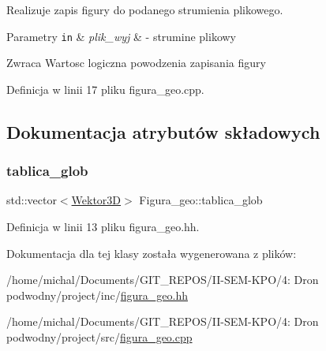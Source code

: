 Realizuje zapis figury do podanego strumienia plikowego. 


\begin{DoxyParams}[1]{Parametry}
\mbox{\tt in}  & {\em plik\+\_\+wyj} & -\/ strumine plikowy \\
\hline
\end{DoxyParams}
\begin{DoxyReturn}{Zwraca}
Wartosc logiczna powodzenia zapisania figury 
\end{DoxyReturn}


Definicja w linii 17 pliku figura\+\_\+geo.\+cpp.



\subsection{Dokumentacja atrybutów składowych}
\mbox{\label{class_figura__geo_a713a4371474b4f5b4d37be1f246da7fc}} 
\subsubsection{\texorpdfstring{tablica\+\_\+glob}{tablica\_glob}}
{\footnotesize\ttfamily std\+::vector$<$\hyperlink{class_wektor3_d}{Wektor3D}$>$ Figura\+\_\+geo\+::tablica\+\_\+glob}



Definicja w linii 13 pliku figura\+\_\+geo.\+hh.



Dokumentacja dla tej klasy została wygenerowana z plików\+:\begin{DoxyCompactItemize}
\item 
/home/michal/\+Documents/\+G\+I\+T\+\_\+\+R\+E\+P\+O\+S/\+I\+I-\/\+S\+E\+M-\/\+K\+P\+O/4\+: Dron podwodny/project/inc/\hyperlink{figura__geo_8hh}{figura\+\_\+geo.\+hh}\item 
/home/michal/\+Documents/\+G\+I\+T\+\_\+\+R\+E\+P\+O\+S/\+I\+I-\/\+S\+E\+M-\/\+K\+P\+O/4\+: Dron podwodny/project/src/\hyperlink{figura__geo_8cpp}{figura\+\_\+geo.\+cpp}\end{DoxyCompactItemize}

